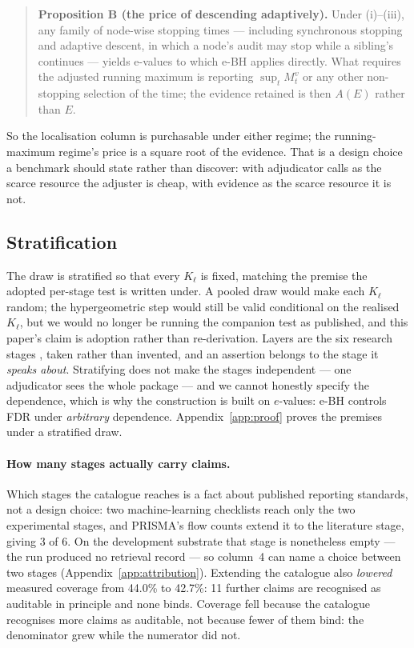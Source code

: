\documentclass[10pt]{article}
\newcommand{\RM}[1]{{#1}}
\begin{document}
\begin{quote}
\textbf{Proposition B (the price of descending adaptively).} Under
(i)--(iii), any family of node-wise stopping times --- including synchronous
stopping and adaptive descent, in which a node's audit may stop while a
sibling's continues --- yields e-values to which e-BH applies directly. What
requires the adjusted running maximum is reporting $\sup_t M^v_t$ or any other
non-stopping selection of the time; the evidence retained is then $A(E)$ rather
than $E$.
\end{quote}

\noindent So the localisation column is purchasable under either regime; the
running-maximum regime's price is a square root of the evidence. That is a
design choice a benchmark should state rather than discover: with adjudicator
calls as the scarce resource the adjuster is cheap, with evidence as the scarce
resource it is not.

\subsection{Stratification}
\label{sec:layers}
The draw is stratified so that every $K_\ell$ is fixed, matching the premise the
adopted per-stage test is written under. A pooled draw would make each $K_\ell$
random; the hypergeometric step would still be valid conditional on the realised
$K_\ell$, but we would no longer be running the companion test as published, and
this paper's claim is adoption rather than re-derivation. Layers are the
six research stages \cite{sixstage}, taken rather than invented, and an
assertion belongs to the stage it \emph{speaks about}. Stratifying does not make
the stages independent --- one adjudicator sees the whole package --- and we
cannot honestly specify the dependence, which is why the construction is built
on $e$-values: e-BH \cite{ebh} controls FDR under \emph{arbitrary} dependence.
Appendix~\ref{app:proof} proves the premises under a stratified draw.

\paragraph{How many stages actually carry claims.} Which stages the catalogue
reaches is a fact about published reporting standards, not a design choice: two
machine-learning checklists reach only the two experimental stages, and PRISMA's
flow counts \cite{prisma} extend it to the literature stage, giving \RM{3} of
\RM{6}. On the development substrate that stage is nonetheless \RM{empty} --- the
run produced no retrieval record --- so column~4 can name a choice between two
stages (Appendix~\ref{app:attribution}). Extending the catalogue also
\emph{lowered} measured coverage from \RM{44.0\%} to \RM{42.7\%}: \RM{11} further
claims are recognised as auditable in principle and none binds. Coverage fell because the catalogue
recognises more claims as auditable, not because fewer of them bind: the
denominator grew while the numerator did not.
\end{document}
